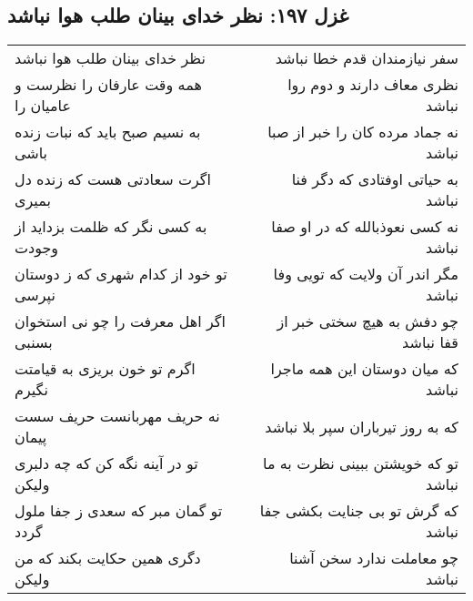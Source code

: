 \begin{center}
\section*{غزل ۱۹۷: نظر خدای بینان طلب هوا نباشد}
\label{sec:197}
\begin{longtable}{l p{0.5cm} r}
نظر خدای بینان طلب هوا نباشد
&&
سفر نیازمندان قدم خطا نباشد
\\
همه وقت عارفان را نظرست و عامیان را
&&
نظری معاف دارند و دوم روا نباشد
\\
به نسیم صبح باید که نبات زنده باشی
&&
نه جماد مرده کان را خبر از صبا نباشد
\\
اگرت سعادتی هست که زنده دل بمیری
&&
به حیاتی اوفتادی که دگر فنا نباشد
\\
به کسی نگر که ظلمت بزداید از وجودت
&&
نه کسی نعوذبالله که در او صفا نباشد
\\
تو خود از کدام شهری که ز دوستان نپرسی
&&
مگر اندر آن ولایت که تویی وفا نباشد
\\
اگر اهل معرفت را چو نی استخوان بسنبی
&&
چو دفش به هیچ سختی خبر از قفا نباشد
\\
اگرم تو خون بریزی به قیامتت نگیرم
&&
که میان دوستان این همه ماجرا نباشد
\\
نه حریف مهربانست حریف سست پیمان
&&
که به روز تیرباران سپر بلا نباشد
\\
تو در آینه نگه کن که چه دلبری ولیکن
&&
تو که خویشتن ببینی نظرت به ما نباشد
\\
تو گمان مبر که سعدی ز جفا ملول گردد
&&
که گرش تو بی جنایت بکشی جفا نباشد
\\
دگری همین حکایت بکند که من ولیکن
&&
چو معاملت ندارد سخن آشنا نباشد
\\
\end{longtable}
\end{center}
